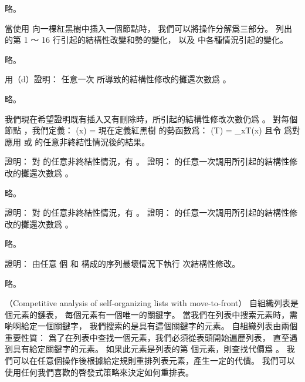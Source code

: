 \startANSWER
略。
\stopANSWER

\startigBase[continue]\startitem
當使用  向一棵紅黑樹中插入一個節點時，
我們可以將操作分解爲三部分。
列出  的第 1 ～ 16 行引起的結構性改變和勢的變化，
以及  中各種情況引起的變化。
\stopitem\stopigBase

\startANSWER
略。
\stopANSWER

\startigBase[continue]\startitem
用（d）證明：
任意一次  所導致的結構性修改的攤還次數爲 。
\stopitem\stopigBase

\startANSWER
略。
\stopANSWER

我們現在希望證明既有插入又有刪除時，所引起的結構性修改次數仍爲 。
對每個節點 ，我們定義：
\startformula
\omega(x) = \startcases
{} \NC {} \NR
{} \NC {} \NR
{} \NC {} \NR
{} \NC {} \NR
\stopcases
\stopformula
現在定義紅黑樹  的勢函數爲：
\startformula
\Phi(T) = \sum_{x\in T}\omega(x)
\stopformula
且令  爲對  應用  或  的任意非終結性情況後的結果。

\startigBase[continue]\startitem
證明：
對  的任意非終結性情況，有 。
證明：  的任意一次調用所引起的結構性修改的攤還次數爲 。
\stopitem\stopigBase

\startANSWER
略。
\stopANSWER

\startigBase[continue]\startitem
證明：
對  的任意非終結性情況，有 。
證明：  的任意一次調用所引起的結構性修改的攤還次數爲 。
\stopitem\stopigBase

\startANSWER
略。
\stopANSWER

\startigBase[continue]\startitem
證明：
由任意  個  和  構成的序列最壞情況下執行  次結構性修改。
\stopitem\stopigBase

\startANSWER
略。
\stopANSWER

\stopPROBLEM

\startPROBLEM
（Competitive analysis of self-organizing lists with move-to-front）
{\EMP 自組織列表}是  個元素的鏈表，
每個元素有一個唯一的關鍵字。
當我們在列表中搜索元素時，需喲啊給定一個關鍵字，
我們搜索的是具有這個關鍵字的元素。
自組織列表由兩個重要性質：
\startigBase[n]
\startitem
爲了在列表中查找一個元素，我們必須從表頭開始遍歷列表，
直至遇到具有給定關鍵字的元素。
如果此元素是列表的第  個元素，則查找代價爲 。
\stopitem
\startitem
我們可以在任意個操作後根據給定規則重排列表元素，產生一定的代價。
我們可以使用任何我們喜歡的啓發式策略來決定如何重排表。
\stopitem
\stopigBase

